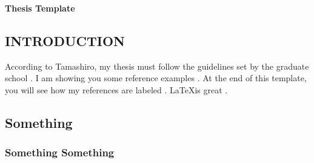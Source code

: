 
\ResetSingleSpace

\begin{center}
{\textbf{
Thesis Template}}
\end{center}

\ResetDoubleSpace

\vskip0.25in

\begin{center}
\section{INTRODUCTION}
\label{sec:Intro}
\end{center}

\setcounter{page}{1}
\thispagestyle{empty}

\vskip-0.1in

\noindent
    According to Tamashiro, my thesis must follow the guidelines set by the graduate school \cite{Tamashiro4}. I am showing you some reference examples \cite{Tamashiro1}. At the end of this template, you will see how my references are labeled \cite{Tamashiro3}. \LaTeX is great \cite{Tamashiro2}.\\
	\indent \lipsum[1]
    \indent \lipsum[2-4]
\belowSubSecSkip
\subsection{Something}
\label{sec:Godiva}

\noindent
	\lipsum[1]
    \indent \lipsum[2-3] 


\subsubsection{Something Something}
\label{sec:Something_Something}

\noindent
	\lipsum[1] 
	\indent \lipsum[2-4]
 

